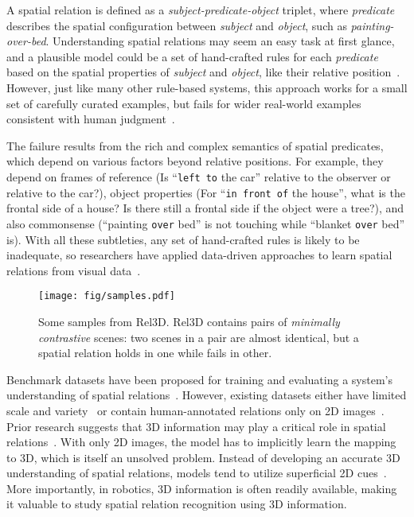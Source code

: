 \documentclass{article}
\newcommand{\smallsec}[1]{\noindent {\bf #1.}}
\newcommand\datasetname{Rel3D}
\begin{document}
A spatial relation is defined as a \emph{subject-predicate-object} triplet, where \emph{predicate} describes the spatial configuration between \emph{subject} and \emph{object}, such as \emph{painting-over-bed}. Understanding spatial relations may seem an easy task at first glance, and a plausible model could be a set of hand-crafted rules for each \emph{predicate} based on the spatial properties of \emph{subject} and \emph{object}, like their relative position~\cite{gapp1995angle,bloch1999fuzzy,matsakis2001linguistic,kelleher2006proximity}. However, just like many other rule-based systems, this approach works for a small set of carefully curated examples, but fails for wider real-world examples consistent with human judgment~\cite{coventry2004saying}.

The failure results from the rich and complex semantics of spatial predicates, which depend on various factors beyond relative positions. For example, they depend on frames of reference (Is ``\texttt{left to} the car'' relative to the observer or relative to the car?), object properties (For ``\texttt{in front of} the house'', what is the frontal side of a house? Is there still a frontal side if the object were a tree?), and also commonsense (``painting \texttt{over} bed'' is not touching while ``blanket \texttt{over} bed'' is). With all these subtleties, any set of hand-crafted rules is likely to be inadequate, so researchers have applied data-driven approaches to learn spatial relations from visual data~\cite{keller1996learning,rosman2011learning,guadarrama2013grounding,boularias2015grounding,zampogiannis2015learning,mota2018incrementally,yang2019spatialsense}.

\begin{figure}[t]
    \centering
    \texttt{[image: fig/samples.pdf]}
    \vspace{-1.5em}
    \caption{Some samples from {\datasetname}. {\datasetname } contains pairs of \emph{minimally contrastive} scenes: two scenes in a pair are almost identical, but a spatial relation holds in one while fails in other.\vspace{-2em}}
    \label{fig:rel3d}
\end{figure}

\smallsec{Benchmarking spatial relations in 3D} Benchmark datasets have been proposed for training and evaluating a system's understanding of spatial relations~\cite{golland2010game,mota2018incrementally,yang2019spatialsense}. However, existing datasets either have limited scale and variety~\cite{golland2010game,mota2018incrementally} or contain human-annotated relations only on 2D images~\cite{mota2018incrementally,yang2019spatialsense}. Prior research suggests that 3D information may play a critical role in spatial relations~\cite{yang2019spatialsense,ye2013exploiting,guadarrama2013grounding,zeng2018semantic}. With only 2D images, the model has to implicitly learn the mapping to 3D, which is itself an unsolved problem. Instead of developing an accurate 3D understanding of spatial relations, models tend to utilize superficial 2D cues~\cite{yang2019spatialsense}. More importantly, in robotics, 3D information is often readily available, making it valuable to study spatial relation recognition using 3D information. 
\end{document}
